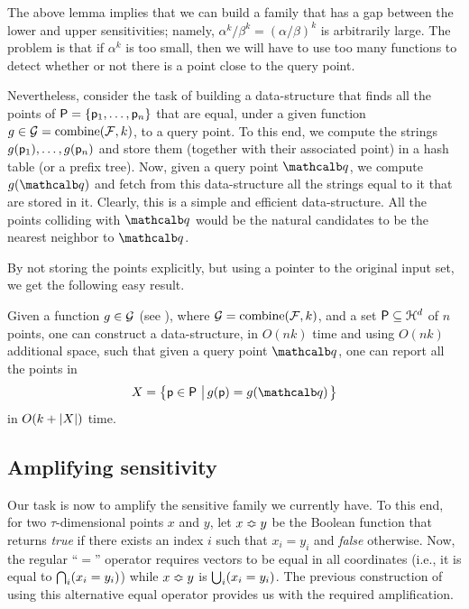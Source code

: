 The above lemma implies that we can build a family that has a gap
between the lower and upper sensitivities; namely, $\alpha^k /\beta^k
= (\alpha/\beta)^k$ is arbitrarily large. The problem is that if
$\alpha^k$ is too small, then we will have to use too many functions
to detect whether or not there is a point close to the query point.

Nevertheless, consider the task of building a data-structure that
finds all the points of ${\mathsf{P}} = \left\{ {\mathsf{p}_1, \ldots, \mathsf{p}_n} \right\}$ that
are equal, under a given function $g \in \FamilyB =
\kFunctions{\Family}{k}$, to a query point. To this end, we compute
the strings $g(\mathsf{p}_1), \ldots, g(\mathsf{p}_n)$ and store them (together
with their associated point) in a hash table (or a prefix tree). Now,
given a query point $\query$, we compute $g(\query)$ and fetch from
this data-structure all the strings equal to it that are stored in it.
Clearly, this is a simple and efficient data-structure. All the points
colliding with $\query$ would be the natural candidates to be the
nearest neighbor to $\query$.

By not storing the points explicitly, but using a pointer to the
original input set, we get the following easy result.

\begin{lemma}    
    Given a function $g \in \mathcal{G}$ (see ), where
    $\FamilyB= \kFunctions{\Family}{k}$, and a set
    ${\mathsf{P}} \subseteq \EuScript{H}^d$ of $n$ points, one can
    construct a data-structure, in $O(nk)$ time and using $O(nk)$
    additional space, such that given a query point $\query$, one can
    report all the points in
    \[
    X = \brc{ \pnt \in \PntSet \sep{ g(\pnt) = g(\query)}}
    \]
    in $O( k + \left| {X} \right| )$ time.
\end{lemma}


\subsection{Amplifying sensitivity}

Our task is now to amplify the sensitive family we currently have. To
this end, for two $\tau$-dimensional points $x$ and $y$, let
${x}\Bumpeq{y}$ be the Boolean function that returns \emph{true} if
there exists an index $i$ such that $x_i = y_i$ and \emph{false}
otherwise. Now, the regular ``$=$'' operator requires vectors to be
equal in all coordinates (i.e., it is equal to
$\bigcap_{i} \pth{x_i = y_i}$) while ${x}\Bumpeq{y}$ is
$\bigcup_i \pth{x_i = y_i}$. The previous construction of
 using this alternative equal operator provides us
with the required amplification.

